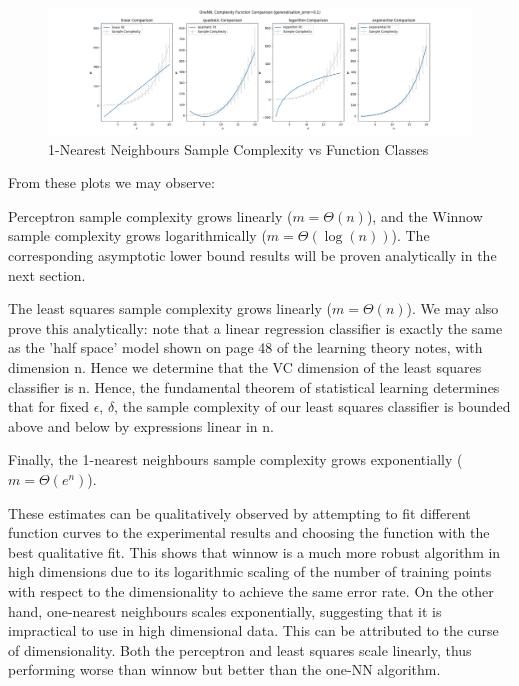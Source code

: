 \documentclass[12pt]{article}
\begin{document}
\begin{itemize}
    \begin{figure}[h]
    \centering
    \includegraphics[scale=0.3]{outputs/part3/q1a_one_nn_complexity_function_comparison.png}
    \caption{1-Nearest Neighbours Sample Complexity vs Function Classes}
    \label{fig:22}
    \end{figure}

    From these plots we may observe:
    
    Perceptron sample complexity grows linearly ($m = \Theta(n)$), and the Winnow sample complexity grows logarithmically ($m = \Theta(\log(n))$). The corresponding asymptotic lower bound results will be proven analytically in the next section.

    The least squares sample complexity grows linearly ($m = \Theta(n)$). We may also prove this analytically: note that a linear regression classifier is exactly the same as the 'half space' model shown on page 48 of the learning theory notes,
     with dimension n. Hence we determine that the VC dimension of the least squares classifier is n. Hence, the fundamental theorem of statistical learning determines that for fixed
     $\epsilon$, $\delta$, the sample complexity of our least squares classifier is bounded above and below by expressions linear in n. 

    Finally, the 1-nearest neighbours sample complexity grows exponentially ($m = \Theta(e^{n})$).

    These estimates can be qualitatively observed by attempting to fit different function curves to the experimental
    results and choosing the function with the best qualitative fit. This shows that winnow is a much more robust 
    algorithm in high dimensions due to its logarithmic scaling of the number of training points with respect to
        the dimensionality to achieve the same error rate. On the other hand, one-nearest neighbours scales exponentially,
        suggesting that it is impractical to use in high dimensional data. This can be attributed to the curse of dimensionality.
        Both the perceptron and least squares scale linearly, thus performing worse than winnow but better than the one-NN algorithm.


\end{itemize}
\end{document}
